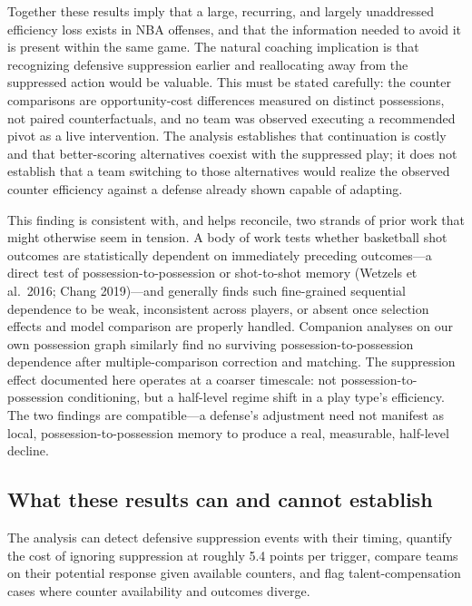 \documentclass[11pt]{article}
\begin{document}
Together these results imply that a large, recurring, and largely unaddressed efficiency loss exists in NBA offenses, and that the information needed to avoid it is present within the same game. The natural coaching implication is that recognizing defensive suppression earlier and reallocating away from the suppressed action would be valuable. This must be stated carefully: the counter comparisons are opportunity-cost differences measured on distinct possessions, not paired counterfactuals, and no team was observed executing a recommended pivot as a live intervention. The analysis establishes that continuation is costly and that better-scoring alternatives coexist with the suppressed play; it does not establish that a team switching to those alternatives would realize the observed counter efficiency against a defense already shown capable of adapting.

This finding is consistent with, and helps reconcile, two strands of prior work that might otherwise seem in tension. A body of work tests whether basketball shot outcomes are statistically dependent on immediately preceding outcomes---a direct test of possession-to-possession or shot-to-shot memory (Wetzels et al.\ 2016; Chang 2019)---and generally finds such fine-grained sequential dependence to be weak, inconsistent across players, or absent once selection effects and model comparison are properly handled. Companion analyses on our own possession graph similarly find no surviving possession-to-possession dependence after multiple-comparison correction and matching. The suppression effect documented here operates at a coarser timescale: not possession-to-possession conditioning, but a half-level regime shift in a play type's efficiency. The two findings are compatible---a defense's adjustment need not manifest as local, possession-to-possession memory to produce a real, measurable, half-level decline.

\subsection{What these results can and cannot establish}

The analysis can detect defensive suppression events with their timing, quantify the cost of ignoring suppression at roughly 5.4 points per trigger, compare teams on their potential response given available counters, and flag talent-compensation cases where counter availability and outcomes diverge.
\end{document}
